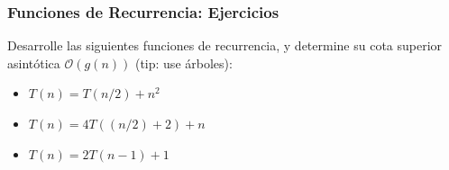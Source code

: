 \documentclass{beamer}
\begin{document}
\begin{frame}[fragile]
 \frametitle{Funciones de Recurrencia: Ejercicios}
\small
Desarrolle las siguientes funciones de recurrencia, y determine su cota superior asintótica $\mathcal{O}(g(n))$ (tip: use árboles):
\begin{itemize}
\item $T(n) = T(n/2) + n^2$
\item $T(n) = 4T((n/2) + 2) + n$
\item $T(n) = 2T(n-1) + 1$
\end{itemize}
\end{frame}


%
%
%
%
%
%
%
%
%
\end{document}
